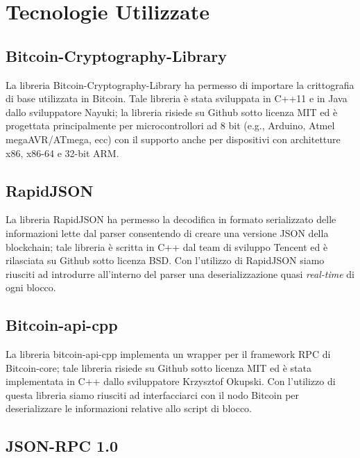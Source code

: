\chapter{Tecnologie Utilizzate}\label{chap:tecnologieUtilizzate}

\section{Bitcoin-Cryptography-Library} \label{sec:cryptographyBitcoinLib}

La libreria Bitcoin-Cryptography-Library \cite{Bitcoin-Cryptography-Library:github} ha permesso di importare la crittografia di base utilizzata in Bitcoin. Tale  libreria è stata sviluppata in C++11 e in Java dallo sviluppatore Nayuki; la libreria risiede su Github sotto licenza MIT ed è progettata principalmente per microcontrollori ad 8 bit (e.g., Arduino, Atmel megaAVR/ATmega, ecc) con il supporto anche per dispositivi con architetture x86, x86-64 e 32-bit ARM.

\section{RapidJSON} \label{sec:rapidjsonLib}

La libreria RapidJSON \cite{rapidjson:github} ha permesso la decodifica in formato serializzato delle informazioni lette dal parser consentendo di creare una versione JSON della blockchain; tale libreria è scritta in C++ dal team di sviluppo Tencent ed è rilasciata su Github sotto licenza BSD.
Con l’utilizzo di RapidJSON siamo riusciti ad introdurre all’interno del parser una deserializzazione quasi \emph{real-time} di ogni blocco.


\section{Bitcoin-api-cpp} \label{sec:bitcoinApiLib}

La libreria bitcoin-api-cpp \cite{bitcoin-api-cpp:github} implementa un wrapper per il framework RPC di Bitcoin-core; tale libreria risiede su Github sotto licenza MIT ed è stata  implementata in C++ dallo sviluppatore Krzysztof Okupski.
Con l'utilizzo di questa libreria siamo riusciti ad interfacciarci con il nodo Bitcoin per deserializzare le informazioni relative allo script di blocco.

\section{JSON-RPC 1.0} \label{sec:jsonrpchttp}

